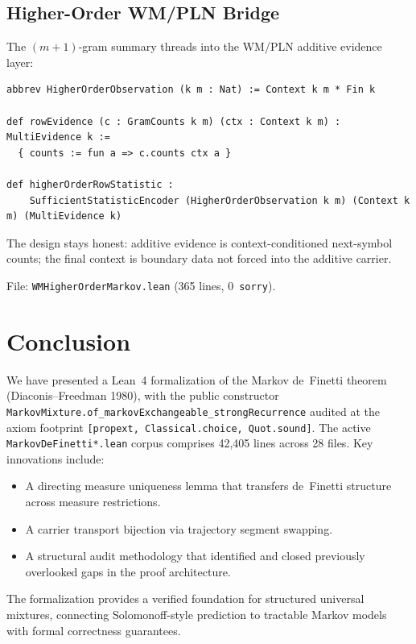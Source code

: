 \documentclass[11pt,a4paper]{article}
\theoremstyle{definition}
\begin{document}
\subsection{Higher-Order WM/PLN Bridge}

The $(m+1)$-gram summary threads into the WM/PLN additive evidence layer:

\begin{lstlisting}
abbrev HigherOrderObservation (k m : Nat) := Context k m * Fin k

def rowEvidence (c : GramCounts k m) (ctx : Context k m) : MultiEvidence k :=
  { counts := fun a => c.counts ctx a }

def higherOrderRowStatistic :
    SufficientStatisticEncoder (HigherOrderObservation k m) (Context k m) (MultiEvidence k)
\end{lstlisting}

The design stays honest: additive evidence is context-conditioned next-symbol
counts; the final context is boundary data not forced into the additive carrier.

File: \texttt{WMHigherOrderMarkov.lean} (365 lines, 0~\texttt{sorry}).

\section{Conclusion}

We have presented a Lean~4 formalization of the Markov de~Finetti theorem
(Diaconis--Freedman 1980), with the public constructor
\texttt{MarkovMixture.of\_markovExchangeable\_strongRecurrence} audited at
the axiom footprint \texttt{[propext, Classical.choice, Quot.sound]}. The
active \texttt{MarkovDeFinetti*.lean} corpus comprises 42,405 lines across
28 files. Key innovations include:

\begin{itemize}
\item A directing measure uniqueness lemma that transfers de~Finetti structure
  across measure restrictions.
\item A carrier transport bijection via trajectory segment swapping.
\item A structural audit methodology that identified and closed previously
  overlooked gaps in the proof architecture.
\end{itemize}

The formalization provides a verified foundation for structured universal
mixtures, connecting Solomonoff-style prediction to tractable Markov models
with formal correctness guarantees.
\end{document}

